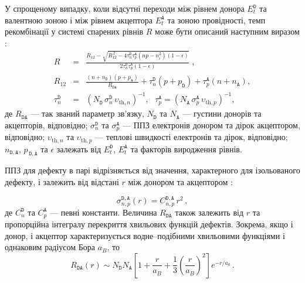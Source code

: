 У спрощеному випадку, коли відсутні переходи між рівнем донора $E_t^{\mathtt{D}}$ та валентною зоною
і між рівнем акцептора $E_t^{\mathtt{A}}$ та зоною провідності,
темп рекомбінації у системі спарених рівнів $R$ може бути описаний наступним виразом \cite{CDLR:JAP1995}:
\begin{eqnarray}
R&=&\frac{R_{12}-\sqrt{R_{12}^{\,2}-4\tau_{n}^{\mathtt{D}}\tau_{p}^{\mathtt{A}}(np-n_i^2)(1-\epsilon)}}{2\tau_{n}^{\mathtt{D}}\tau_{p}^{\mathtt{A}}(1-\epsilon)}\;,\label{eqR}\\
R_{12}&=&\frac{(n+n_{\mathtt{D}})(p+p_{\mathtt{A}})}{R_{\mathtt{DA}}}+
\tau_{n}^{\mathtt{D}}(p+p_{\mathtt{D}})+\tau_{p}^{\mathtt{A}}(n+n_{\mathtt{A}}),\label{eqR12}\\
\tau_{n}^{\mathtt{D}}&=&(N_{\mathtt{D}}\,\sigma_{n}^{\mathtt{D}}\,\upsilon_{\mathrm{th},n})^{-1},\,\,\,\,
\tau_{p}^{\mathtt{A}}=(N_{\mathtt{A}}\,\sigma_{p}^{\mathtt{A}}\,\upsilon_{\mathrm{th},p})^{-1},\label{eqTAU}
\end{eqnarray}
де
$R_{\mathtt{DA}}$ --- так званий параметр зв'язку,
$N_{\mathtt{D}}$ та $N_{\mathtt{A}}$ --- густини донорів та акцепторів, відповідно;
$\sigma_{n}^{\mathtt{D}}$ та $\sigma_{p}^{\mathtt{A}}$ --- ППЗ електронів донором та дірок акцептором, відповідно;
$\upsilon_{\mathrm{th},n}$ та $\upsilon_{\mathrm{th},p}$ --- теплові швидкості електронів та дірок, відповідно;
$n_{\mathtt{D,A}}$, $p_{\,\mathtt{D,A}}$ та $\epsilon$ залежать від $E_t^{\mathtt{D}}$, $E_t^{\mathtt{A}}$ та факторів виродження рівнів.

ППЗ для дефекту в парі відрізняється від значення, характерного для ізольованого дефекту, і залежить від відстані $r$ між донором та акцептором \cite{CDLR:JAP}:

\begin{equation}
\label{eqSigma}
\sigma_{n,p}^{\mathtt{D,A}}(r)=C_{n,p}^{\mathtt{D,A}}\,r^2\,,
\end{equation}
де $C_{n}^{\mathtt{D}}$ та $C_{p}^{\mathtt{A}}$ --- певні константи.
Величина $R_{\mathtt{DA}}$ також залежить від $r$ та пропорційна інтегралу перекриття хвильових функцій дефектів.
Зокрема, якщо і донор, і акцептор характеризується водне--подібними хвильовими функціями і однаковим радіусом Бора $a_B$, то \cite{CDLR:JAP}
\begin{equation}
\label{eqRda}
R_{\mathtt{DA}} (r) \sim N_{\mathtt{D}}N_{\mathtt{A}}\left[1+\frac{r}{a_B}+\frac{1}{3}\left(\frac{r}{a_B}\right)^2\right]
   e^{-r/a_0}\,.
\end{equation}


